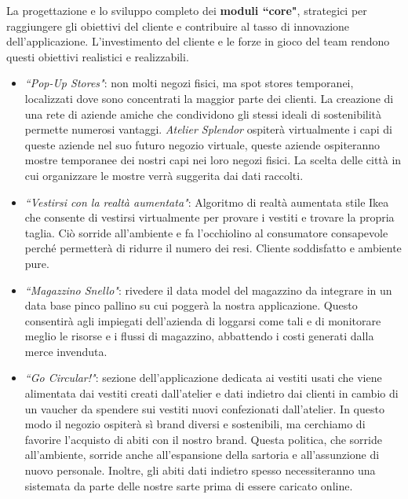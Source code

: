 \documentclass[12pt]{article}
\begin{document}
La progettazione e lo sviluppo completo dei \textbf{moduli ``core"}, strategici per raggiungere gli obiettivi del cliente e contribuire al tasso di innovazione dell'applicazione. L'investimento del cliente e le forze in gioco del team rendono questi obiettivi realistici e realizzabili.

\begin{itemize}
    \item {\em ``Pop-Up Stores"}: non molti negozi fisici, ma spot stores temporanei, localizzati dove sono concentrati la maggior parte dei clienti. La creazione di una rete di aziende amiche che condividono gli stessi ideali di sostenibilità permette numerosi vantaggi. {\em Atelier Splendor} ospiterà virtualmente i capi di queste aziende nel suo futuro negozio virtuale, queste aziende ospiteranno mostre temporanee dei nostri capi nei loro negozi fisici. La scelta delle città in cui organizzare le mostre verrà suggerita dai dati raccolti.
    \item {\em ``Vestirsi con la realtà aumentata"}: Algoritmo di realtà aumentata stile Ikea che consente di vestirsi virtualmente per provare i vestiti e trovare la propria taglia. Ciò sorride all'ambiente e fa l'occhiolino al consumatore consapevole perché permetterà di ridurre il numero dei resi. Cliente soddisfatto e ambiente pure. 
    \item {\em ``Magazzino Snello"}: rivedere il data model del magazzino da integrare in un data base pinco pallino su cui poggerà la nostra applicazione. Questo consentirà agli impiegati dell'azienda di loggarsi come tali e di monitorare meglio le risorse e i flussi di magazzino, abbattendo i costi generati dalla merce invenduta.
    \item {\em ``Go Circular!"}: sezione dell'applicazione dedicata ai vestiti usati che viene alimentata dai vestiti creati dall'atelier e dati indietro dai clienti in cambio di un vaucher da spendere sui vestiti nuovi confezionati dall'atelier. In questo modo il negozio ospiterà sì brand diversi e sostenibili, ma cerchiamo di favorire l'acquisto di abiti con il nostro brand. Questa politica, che sorride all'ambiente, sorride anche all'espansione della sartoria e all'assunzione di nuovo personale. Inoltre, gli abiti dati indietro spesso necessiteranno una sistemata da parte delle nostre sarte prima di essere caricato online.
    
\end{itemize}
\end{document}
